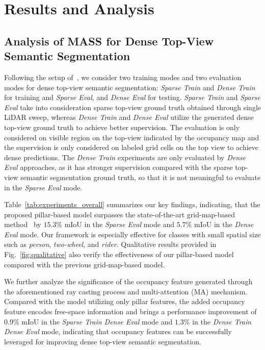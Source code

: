 \documentclass[lettersize,journal]{IEEEtran}
\begin{document}
\section{Results and Analysis}
\subsection{Analysis of MASS for Dense Top-View Semantic Segmentation}
\label{sec:analysis_of_mass}
Following the setup of~\cite{bieder2020exploiting}, we consider two training modes and two evaluation modes for dense top-view semantic segmentation: \emph{Sparse Train} and \emph{Dense Train} for training and \emph{Sparse Eval}, and \emph{Dense Eval} for testing. 
\emph{Sparse Train} and \emph{Sparse Eval} take into consideration sparse top-view ground truth obtained through single LiDAR sweep, whereas \emph{Dense Train} and \emph{Dense Eval} utilize the generated dense top-view ground truth to achieve better supervision. 
The evaluation is only considered on visible region on the top-view indicated by the occupancy map and the supervision is only considered on labeled grid cells on the top view to achieve dense predictions. The \emph{Dense Train} experiments are only evaluated by \emph{Dense Eval} approaches, as it has stronger supervision compared with the sparse top-view semantic segmentation ground truth, so that it is not meaningful to evaluate in the \emph{Sparse Eval} mode.

Table~\ref{tab:experiments_overall} summarizes our key findings, indicating, that the proposed pillar-based model surpasses the state-of-the-art grid-map-based method~\cite{bieder2020exploiting} by $15.3\%$ mIoU in the \emph{Sparse Eval} mode and $5.7\%$ mIoU in the \emph{Dense Eval} mode.
Our framework is especially effective for classes with small spatial size such as \emph{person}, \emph{two-wheel}, and \emph{rider}. 
Qualitative results provided in Fig.~\ref{fig:qualitative} also verify the effectiveness of our pillar-based model compared with the previous grid-map-based model. 

We further analyze the significance of the occupancy feature generated through the aforementioned ray casting process and multi-attention (MA) mechanism.
Compared with the model utilizing only pillar features, the added occupancy feature encodes free-space information and brings a performance improvement of $0.9\%$ mIoU in the \emph{Sparse Train Dense Eval} mode and $1.3\%$ in the \emph{Dense Train Dense Eval} mode, indicating that occupancy features can be successfully leveraged for improving dense top-view semantic segmentation. 
\end{document}
